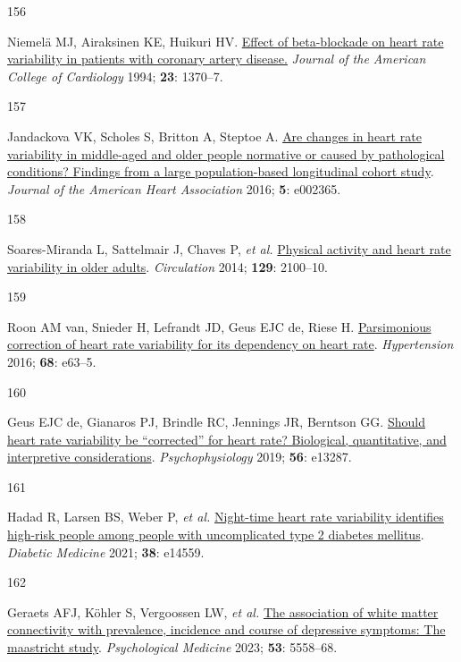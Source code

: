 \documentclass[
  a4paper,
  headsepline=true,
  open=left]{scrbook}
\newlength{\cslhangindent}
\newlength{\csllabelwidth}
\newlength{\cslentryspacingunit} %
\newenvironment{CSLReferences}[2] %
 {%
  \setlength{\parindent}{0pt}
  \ifodd #1
  \let\oldpar\par
  \def\par{\hangindent=\cslhangindent\oldpar}
  \fi
  \setlength{\parskip}{#2\cslentryspacingunit}
 }%
 {}
\newcommand{\CSLLeftMargin}[1]{\parbox[t]{\csllabelwidth}{#1}}
\newcommand{\CSLRightInline}[1]{\parbox[t]{\linewidth - \csllabelwidth}{#1}\break}
\begin{document}
\begin{CSLReferences}{0}{0}
\leavevmode{}%
\CSLLeftMargin{156 }%
\CSLRightInline{Niemelä MJ, Airaksinen KE, Huikuri HV.
\href{https://doi.org/10.1016/0735-1097(94)90379-4}{Effect of
beta-blockade on heart rate variability in patients with coronary artery
disease.} \emph{Journal of the American College of Cardiology} 1994;
\textbf{23}: 1370--7.}

\leavevmode{}%
\CSLLeftMargin{157 }%
\CSLRightInline{Jandackova VK, Scholes S, Britton A, Steptoe A.
\href{https://doi.org/doi:10.1161/JAHA.115.002365}{Are changes in heart
rate variability in middle{-}aged and older people normative or caused
by pathological conditions? Findings from a large population{-}based
longitudinal cohort study}. \emph{Journal of the American Heart
Association} 2016; \textbf{5}: e002365.}

\leavevmode{}%
\CSLLeftMargin{158 }%
\CSLRightInline{Soares-Miranda L, Sattelmair J, Chaves P, \emph{et al.}
\href{https://doi.org/10.1161/CIRCULATIONAHA.113.005361}{Physical
activity and heart rate variability in older adults}. \emph{Circulation}
2014; \textbf{129}: 2100--10.}

\leavevmode{}%
\CSLLeftMargin{159 }%
\CSLRightInline{Roon AM van, Snieder H, Lefrandt JD, Geus EJC de, Riese
H. \href{https://doi.org/10.1161/HYPERTENSIONAHA.116.08053}{Parsimonious
correction of heart rate variability for its dependency on heart rate}.
\emph{Hypertension} 2016; \textbf{68}: e63--5.}

\leavevmode{}%
\CSLLeftMargin{160 }%
\CSLRightInline{Geus EJC de, Gianaros PJ, Brindle RC, Jennings JR,
Berntson GG. \href{https://doi.org/10.1111/psyp.13287}{Should heart rate
variability be {``}corrected{''} for heart rate? Biological,
quantitative, and interpretive considerations}. \emph{Psychophysiology}
2019; \textbf{56}: e13287.}

\leavevmode{}%
\CSLLeftMargin{161 }%
\CSLRightInline{Hadad R, Larsen BS, Weber P, \emph{et al.}
\href{https://doi.org/10.1111/dme.14559}{Night-time heart rate
variability identifies high-risk people among people with uncomplicated
type 2 diabetes mellitus}. \emph{Diabetic Medicine} 2021; \textbf{38}:
e14559.}

\leavevmode{}%
\CSLLeftMargin{162 }%
\CSLRightInline{Geraets AFJ, Köhler S, Vergoossen LW, \emph{et al.}
\href{https://doi.org/10.1017/S0033291722002768}{The association of
white matter connectivity with prevalence, incidence and course of
depressive symptoms: The maastricht study}. \emph{Psychological
Medicine} 2023; \textbf{53}: 5558--68.}


\end{CSLReferences}
\end{document}
